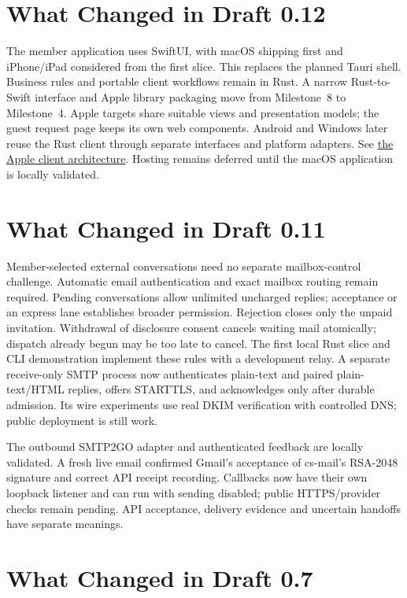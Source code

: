 \documentclass[11pt]{article}
\begin{document}
\section{What Changed in Draft 0.12}

The member application uses SwiftUI, with macOS shipping first and iPhone/iPad
considered from the first slice. This replaces the planned Tauri shell. Business
rules and portable client workflows remain in Rust. A narrow Rust-to-Swift
interface and Apple library packaging move from Milestone~8 to Milestone~4.
Apple targets share suitable views and presentation models; the guest request page
keeps its own web components. Android and Windows later reuse the Rust client
through separate interfaces and platform adapters. See
\href{docs/apple-client-architecture.md}{the Apple client architecture}.
Hosting remains deferred until the macOS application is locally validated.

\section{What Changed in Draft 0.11}

Member-selected external conversations need no separate mailbox-control challenge.
Automatic email authentication and exact mailbox routing remain required. Pending
conversations allow unlimited uncharged replies; acceptance or an express lane
establishes broader permission. Rejection closes only the unpaid invitation.
Withdrawal of disclosure consent cancels waiting mail atomically; dispatch already
begun may be too late to cancel. The first local Rust slice and CLI demonstration
implement these rules with a development relay. A separate receive-only SMTP
process now authenticates plain-text and paired plain-text/HTML replies, offers
STARTTLS, and acknowledges only after durable admission. Its wire experiments
use real DKIM verification with controlled DNS; public deployment is still work.


The outbound SMTP2GO adapter and authenticated feedback are locally validated.
A fresh live email confirmed Gmail's acceptance of cs-mail's RSA-2048 signature
and correct API receipt recording. Callbacks now have their own loopback listener
and can run with sending disabled; public HTTPS/provider checks remain pending.
API acceptance, delivery evidence and uncertain handoffs have separate meanings.

\section{What Changed in Draft 0.7}
\end{document}
